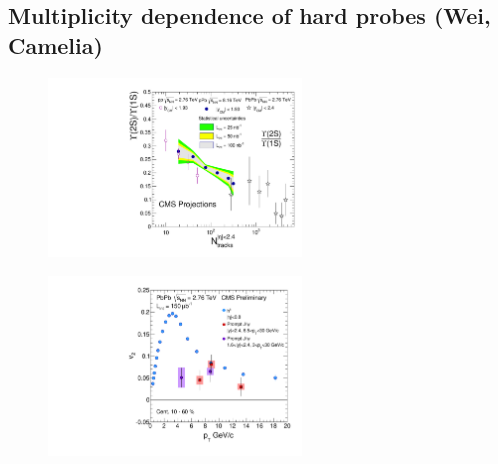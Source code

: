 \subsection{Multiplicity dependence of hard probes (Wei, Camelia)}

\begin{figure}[thb]
  \begin{center}
    \includegraphics[width=0.6\textwidth]{figures/Upsilon_pPb_proj_combineLumi.pdf}
    \caption{ 
    }
    \label{fig:UpsilonvsNtrk}
  \end{center}
\end{figure} 

\begin{figure}[thb]
  \begin{center}
    \includegraphics[width=0.6\textwidth]{figures/comp_v2_pTs_CMSflow_Prp_Cor.pdf}
    \caption{ 
    }
    \label{fig:v2_Jpsi}
  \end{center}
\end{figure} 

\clearpage